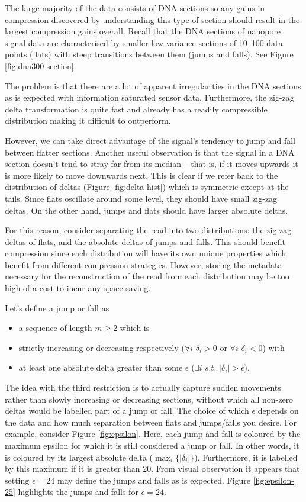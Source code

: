 

The large majority of the data consists of DNA sections so any gains in
compression discovered by understanding this type of section should
result in the largest compression gains overall. Recall that the DNA sections
of nanopore signal data are characterised by smaller low-variance sections of
10--100 data points (flats) with steep transitions between them (jumps and
falls). See Figure \ref{fig:dna300-section}.

The problem is that there are a lot of apparent irregularities in the DNA
sections as is expected with information saturated sensor data. Furthermore, the
zig-zag delta transformation is quite fast and already has a readily
compressible distribution making it difficult to outperform.

However, we can take direct advantage of the signal's tendency to jump and fall
between flatter sections. Another useful observation is that the signal in a DNA
section doesn't tend to stray far from its median -- that is, if it moves
upwards it is more likely to move downwards next. This is clear if we refer back
to the distribution of deltas (Figure \ref{fig:delta-hist}) which is symmetric
except at the tails. Since flats oscillate around some level, they should have
small zig-zag deltas. On the other hand, jumps and flats should have larger
absolute deltas.

For this reason, consider separating the read into two distributions: the
zig-zag deltas of flats, and the absolute deltas of jumps and falls. This should
benefit compression since each distribution will have its own unique properties
which benefit from different compression strategies. However, storing the
metadata necessary for the reconstruction of the read from each distribution may
be too high of a cost to incur any space saving.

Let's define a jump or fall as
\begin{itemize}
	\item a sequence of length $m\ge 2$ which is
	\item strictly increasing or decreasing respectively ($\forall i$ $\delta_i>0$ or $\forall i$ $\delta_i < 0$) with
	\item at least one absolute delta greater than some $\epsilon$ ($\exists i$ $s.t.$ $|\delta_i|>\epsilon$).
\end{itemize}

The idea with the third restriction is to actually capture sudden movements
rather than slowly increasing or decreasing sections, without which all non-zero
deltas would be labelled part of a jump or fall. The choice of which $\epsilon$
depends on the data and how much separation between flats and jumps/falls you
desire. For example, consider Figure \ref{fig:epsilon}. Here, each jump and fall
is coloured by the maximum epsilon for which it is still considered a jump or
fall. In other words, it is coloured by its largest absolute delta
($\max_i\{|\delta_i|\}$). Furthermore, it is labelled by this maximum if it is
greater than 20. From visual observation it appears that setting $\epsilon=24$
may define the jumps and falls as is expected. Figure \ref{fig:epsilon-25}
highlights the jumps and falls for $\epsilon=24$.

